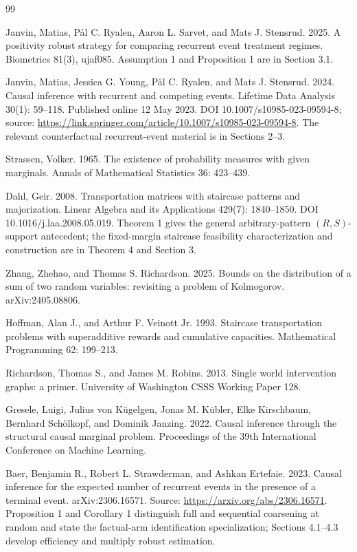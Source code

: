 \documentclass{article}
\begin{document}
\begin{thebibliography}{99}

   Janvin, Matias, Pål C. Ryalen, Aaron L. Sarvet, and Mats J. Stensrud. 2025. A positivity robust strategy for comparing recurrent event treatment regimes. Biometrics 81(3), ujaf085. Assumption 1 and Proposition 1 are in Section 3.1.

   Janvin, Matias, Jessica G. Young, Pål C. Ryalen, and Mats J. Stensrud. 2024. Causal inference with recurrent and competing events. Lifetime Data Analysis 30(1): 59--118. Published online 12 May 2023. DOI 10.1007/s10985-023-09594-8; source: \url{https://link.springer.com/article/10.1007/s10985-023-09594-8}. The relevant counterfactual recurrent-event material is in Sections 2--3.

   Strassen, Volker. 1965. The existence of probability measures with given marginals. Annals of Mathematical Statistics 36: 423--439.

   Dahl, Geir. 2008. Transportation matrices with staircase patterns and majorization. Linear Algebra and its Applications 429(7): 1840--1850. DOI 10.1016/j.laa.2008.05.019. Theorem 1 gives the general arbitrary-pattern \((R,S)\)-support antecedent; the fixed-margin staircase feasibility characterization and construction are in Theorem 4 and Section 3.

   Zhang, Zhehao, and Thomas S. Richardson. 2025. Bounds on the distribution of a sum of two random variables: revisiting a problem of Kolmogorov. arXiv:2405.08806.

   Hoffman, Alan J., and Arthur F. Veinott Jr. 1993. Staircase transportation problems with superadditive rewards and cumulative capacities. Mathematical Programming 62: 199--213.

   Richardson, Thomas S., and James M. Robins. 2013. Single world intervention graphs: a primer. University of Washington CSSS Working Paper 128.

   Gresele, Luigi, Julius von Kügelgen, Jonas M. Kübler, Elke Kirschbaum, Bernhard Schölkopf, and Dominik Janzing. 2022. Causal inference through the structural causal marginal problem. Proceedings of the 39th International Conference on Machine Learning.

   Baer, Benjamin R., Robert L. Strawderman, and Ashkan Ertefaie. 2023. Causal inference for the expected number of recurrent events in the presence of a terminal event. arXiv:2306.16571. Source: \url{https://arxiv.org/abs/2306.16571}. Proposition 1 and Corollary 1 distinguish full and sequential coarsening at random and state the factual-arm identification specialization; Sections 4.1--4.3 develop efficiency and multiply robust estimation.


\end{thebibliography}
\end{document}
